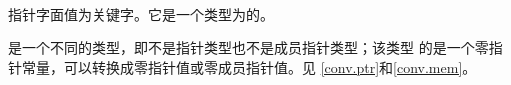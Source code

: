 
\paragraph{} %
指针字面值为关键字。它是一个类型为的\prvalue{}。

\begin{note}
  是一个不同的类型，即不是指针类型也不是成员指针类型；该类型
  的\prvalue{}是一个零指针常量，可以转换成零指针值或零成员指针值。见
  \ref{conv.ptr}和\ref{conv.mem}。
\end{note}
